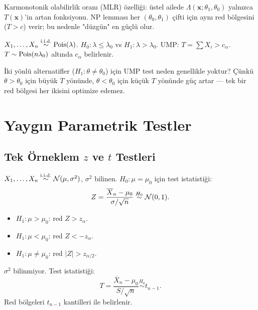 \begin{ispatiskele}
Karmonotonik olabilirlik oranı (MLR) özelliği: üstel ailede $\Lambda(\mathbf{x};\theta_1,\theta_0)$ yalnızca $T(\mathbf{x})$'in artan fonksiyonu. NP lemması her $(\theta_0,\theta_1)$ çifti için aynı red bölgesini ($T>c$) verir; bu nedenle "düzgün" en güçlü olur.
\end{ispatiskele}

\begin{ornek}\label{ex:poisson_ump}
$X_1,\ldots,X_n\overset{\text{i.i.d.}}{\sim}\operatorname{Pois}(\lambda)$. $H_0:\lambda\leq\lambda_0$ vs $H_1:\lambda>\lambda_0$. UMP: $T=\sum X_i>c_\alpha$. $T\sim\operatorname{Pois}(n\lambda_0)$ altında $c_\alpha$ belirlenir.
\end{ornek}

\begin{kritiksorgu}
İki yönlü alternatifler ($H_1:\theta\neq\theta_0$) için UMP test neden genellikle yoktur? Çünkü $\theta>\theta_0$ için büyük $T$ yönünde, $\theta<\theta_0$ için küçük $T$ yönünde güç artar --- tek bir red bölgesi her ikisini optimize edemez.
\end{kritiksorgu}

\section{Yaygın Parametrik Testler}
\label{sec:parametrik_testler}

\subsection{Tek Örneklem $z$ ve $t$ Testleri}

\begin{teorem}[$z$-testi]\label{thm:z_testi}
$X_1,\ldots,X_n\overset{\text{i.i.d.}}{\sim}\mathcal{N}(\mu,\sigma^2)$, $\sigma^2$ bilinen. $H_0:\mu=\mu_0$ için test istatistiği:
\[
  Z = \frac{\overline{X}_n-\mu_0}{\sigma/\sqrt{n}} \overset{H_0}{\sim} \mathcal{N}(0,1).
\]
\begin{itemize}
  \item $H_1:\mu>\mu_0$: red $Z>z_\alpha$.
  \item $H_1:\mu<\mu_0$: red $Z<-z_\alpha$.
  \item $H_1:\mu\neq\mu_0$: red $|Z|>z_{\alpha/2}$.
\end{itemize}
\end{teorem}

\begin{teorem}[$t$-testi]\label{thm:t_testi}
$\sigma^2$ bilinmiyor. Test istatistiği:
\[
  T = \frac{\overline{X}_n-\mu_0}{S/\sqrt{n}} \overset{H_0}{\sim} t_{n-1}.
\]
Red bölgeleri $t_{n-1}$ kantilleri ile belirlenir.
\end{teorem}

